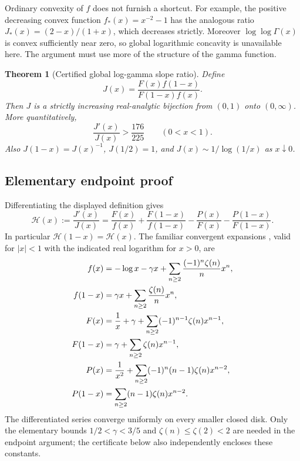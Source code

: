 \documentclass[11pt,a4paper]{article}
\numberwithin{equation}{section}
\theoremstyle{plain}
\newtheorem{theorem}{Theorem}[section]
\theoremstyle{definition}
\theoremstyle{remark}
\begin{document}
Ordinary convexity of $f$ does not furnish a shortcut. For example,
the positive decreasing convex function $f_*(x)=x^{-2}-1$ has the
analogous ratio $J_*(x)=(2-x)/(1+x)$, which decreases strictly.
Moreover $\log\log\Gamma(x)$ is convex sufficiently near zero, so
global logarithmic concavity is unavailable here. The argument must
use more of the structure of the gamma function.

\begin{theorem}[Certified global log-gamma slope ratio]
\label{gs:thm:monotonicity}
Define
\[
 J(x)=\frac{F(x)f(1-x)}{F(1-x)f(x)}.
\]
Then $J$ is a strictly increasing real-analytic bijection from $(0,1)$
onto $(0,\infty)$. More quantitatively,
\begin{equation}\label{gs:eq:global-derivative}
 \frac{J'(x)}{J(x)}>\frac{176}{225}\qquad(0<x<1).
\end{equation}
Also $J(1-x)=J(x)^{-1}$, $J(1/2)=1$, and
$J(x)\sim1/\log(1/x)$ as $x\downarrow0$.
\end{theorem}

\subsection{Elementary endpoint proof}

Differentiating the displayed definition gives
\begin{equation}\label{gs:eq:H}
 \mathcal H(x):=\frac{J'(x)}{J(x)}
 =\frac{F(x)}{f(x)}+\frac{F(1-x)}{f(1-x)}
  -\frac{P(x)}{F(x)}-\frac{P(1-x)}{F(1-x)}.
\end{equation}
In particular $\mathcal H(1-x)=\mathcal H(x)$.
The familiar convergent expansions \cite[\S5.7]{joint:DLMF}, valid
for $|x|<1$ with the indicated real logarithm for $x>0$, are
\begin{align}
 f(x)&=-\log x-\gamma x+
               \sum_{n\ge2}\frac{(-1)^n\zeta(n)}n x^n,\notag\\
 f(1-x)&=\gamma x+\sum_{n\ge2}\frac{\zeta(n)}n x^n,\notag\\
 F(x)&=\frac1x+\gamma+
               \sum_{n\ge2}(-1)^{n-1}\zeta(n)x^{n-1},\notag\\
 F(1-x)&=\gamma+\sum_{n\ge2}\zeta(n)x^{n-1},\notag\\
 P(x)&=\frac1{x^2}+\sum_{n\ge2}(-1)^n(n-1)\zeta(n)x^{n-2},\notag\\
 P(1-x)&=\sum_{n\ge2}(n-1)\zeta(n)x^{n-2}.
 \label{gs:eq:series}
\end{align}
The differentiated series converge uniformly on every smaller closed
disk. Only the elementary bounds $1/2<\gamma<3/5$ and
$\zeta(n)\le\zeta(2)<2$ are needed in the endpoint argument; the
certificate below also independently encloses these constants.
\end{document}
